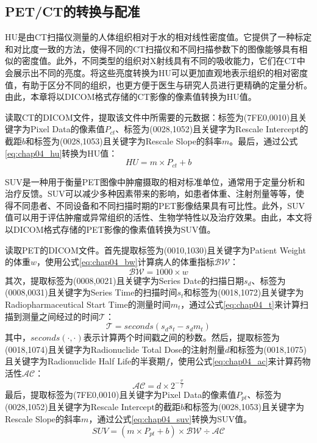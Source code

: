 \subsection{PET/CT的转换与配准}

HU是由CT扫描仪测量的人体组织相对于水的相对线性密度值。它提供了一种标定和对比度一致的方法，使得不同的CT扫描仪和不同扫描参数下的图像能够具有相似的密度值。此外，不同类型的组织对X射线具有不同的吸收能力，它们在CT中会展示出不同的亮度。将这些亮度转换为HU可以更加直观地表示组织的相对密度值，有助于区分不同的组织，也更方便于医生与研究人员进行更精确的定量分析。由此，本章将以DICOM格式存储的CT影像的像素值转换为HU值。

读取CT的DICOM文件，提取该文件中所需要的元数据：标签为(7FE0,0010)且关键字为Pixel Data的像素值\(P_{ct}\)、标签为(0028,1052)且关键字为Rescale Intercept的截距\(b\)和标签为(0028,1053)且关键字为Rescale Slope的斜率\(m\)。最后，通过公式\ref{eq:chap04_hu}转换为HU值：
\begin{equation}
  HU = m \times P_{ct} + b
  \label{eq:chap04_hu}
\end{equation}

SUV是一种用于衡量PET图像中肿瘤摄取的相对标准单位，通常用于定量分析和治疗反馈。SUV可以减少多种因素带来的影响，如患者体重、注射剂量等等，使得不同患者、不同设备和不同扫描时期的PET影像结果具有可比性。此外，SUV值可以用于评估肿瘤或异常组织的活性、生物学特性以及治疗效果。由此，本文将以DICOM格式存储的PET影像的像素值转换为SUV值。

读取PET的DICOM文件。首先提取标签为(0010,1030)且关键字为Patient Weight的体重\(w\)，使用公式\ref{eq:chap04_bw}计算病人的体重指标\(\mathcal{BW}\)：
\begin{equation}
  \mathcal{BW} = 1000 \times w
  \label{eq:chap04_bw}
\end{equation}
其次，提取标签为(0008,0021)且关键字为Series Date的扫描日期\(s_d\)、标签为(0008,0031)且关键字为Series Time的扫描时间\(s_t\)和标签为(0018,1072)且关键字为Radiopharmaceutical Start Time的测量时间\(m_t\)，通过公式\ref{eq:chap04_t}来计算扫描到测量之间经过的时间\(\mathcal{T}\)：
\begin{equation}
  \mathcal{T} = seconds(s_ds_t - s_dm_t)
  \label{eq:chap04_t}
\end{equation}
其中，\(seconds(\cdot, \cdot)\)表示计算两个时间戳之间的秒数。然后，提取标签为(0018,1074)且关键字为Radionuclide Total Dose的注射剂量\(d\)和标签为(0018,1075)且关键字为Radionuclide Half Life的半衰期\(f\)，使用公式\ref{eq:chap04_ac}来计算药物活性\(\mathcal{AC}\)：
\begin{equation}
  \mathcal{AC} = d \times 2^{-\frac{\mathcal{T}}{f}}
  \label{eq:chap04_ac}
\end{equation}
最后，提取标签为(7FE0,0010)且关键字为Pixel Data的像素值\(P_{pt}\)、标签为(0028,1052)且关键字为Rescale Intercept的截距\(b\)和标签为(0028,1053)且关键字为Rescale Slope的斜率\(m\)，通过公式\ref{eq:chap04_suv}转换为SUV值。
\begin{equation}
  SUV = (m \times P_{pt} + b) \times \mathcal{BW} \div \mathcal{AC}
  \label{eq:chap04_suv}
\end{equation}

